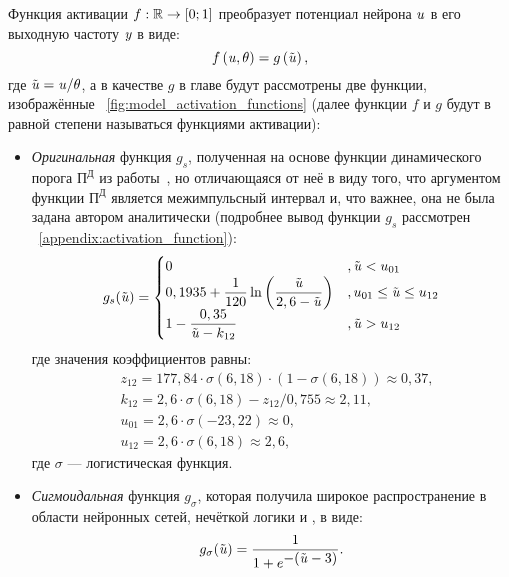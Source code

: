 Функция активации $f: \mathbb{R} \to \left[0;1\right]$ преобразует потенциал нейрона $\mathit{u}$ в его выходную частоту $\mathit{y}$ в виде:
\begin{equation}
    \label{eq:activation_function}
    f\left( \mathit{u}, \theta \right) = g\left( \tilde{\mathit{u}} \right), 
\end{equation}
где $\tilde{\mathit{u}} = \mathit{u} / \theta$, а в качестве $g$ в главе будут рассмотрены две функции, изображённые \onfigure~\ref{fig:model_activation_functions} (далее функции $f$ и $g$ будут в равной степени называться функциями активации):
\begin{itemize}
	\item \textit{Оригинальная} функция $g_{s}$, полученная на основе функции динамического порога $\text{П}^\text{Д}$ из работы~\cite{EmelyanovYaroslavsky1990}, но отличающаяся от неё в виду того, что аргументом функции  $\text{П}^\text{Д}$ является межимпульсный интервал и, что важнее, она не была задана автором аналитически (подробнее вывод функции $g_{s}$ рассмотрен \inappendix~\ref{appendix:activation_function}):
		\begin{equation}
            \label{eq:activation_function_original}
            g_{s}(\tilde{\mathit{u}}) = 
            \begin{cases}
                0                                                                                               &, \tilde{\mathit{u}} < u_{01} \\
                0,1935 + \dfrac{1}{120} \ln\left( \dfrac{\tilde{\mathit{u}}}{2,6 - \tilde{\mathit{u}}} \right)  &, u_{01} \le \tilde{\mathit{u}} \le u_{12} \\
                1 - \dfrac{0,35}{\tilde{\mathit{u}} - k_{12}}                                                   &, \tilde{\mathit{u}} > u_{12} \\
            \end{cases}
		\end{equation}
        где значения коэффициентов равны:
        \begin{align*}
            &z_{12} = 177,84 \cdot \sigma\left(6,18\right) \cdot \left(1 - \sigma\left(6,18\right)\right) \approx 0,37, \\
            &k_{12} = 2,6 \cdot \sigma\left(6,18\right) - z_{12} / 0,755 \approx 2,11, \\
            &u_{01} = 2,6 \cdot \sigma\left(-23,22\right) \approx 0, \\
            &u_{12} = 2,6 \cdot \sigma\left(6,18\right) \approx 2,6,
        \end{align*}
        где $\sigma$ --- логистическая функция.
	\item \textit{Сигмоидальная} функция $g_{\sigma}$, которая получила широкое распространение в области нейронных сетей, нечёткой логики и \other, в виде:
		\begin{equation}
            \label{eq:activation_function_sigma}
			g_{\sigma}(\tilde{\mathit{u}}) = \dfrac{1}{1 + e^{\displaystyle -(\tilde{\mathit{u}} - 3)}}.
		\end{equation}
\end{itemize}

